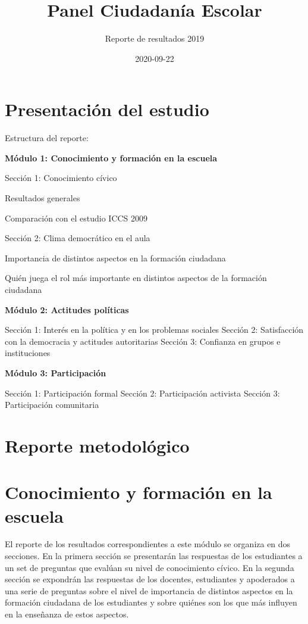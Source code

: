 \documentclass[
  14pt,
]{book}
\title{Panel Ciudadanía Escolar}
\subtitle{Reporte de resultados 2019}
\author{}
\date{\vspace{-2.5em}2020-09-22}
\begin{document}
\maketitle

{
\setcounter{tocdepth}{1}
\tableofcontents
}
\hypertarget{presentaciuxf3n-del-estudio}{%
\chapter*{Presentación del estudio}\label{presentaciuxf3n-del-estudio}}

Estructura del reporte:

\textbf{Módulo 1: Conocimiento y formación en la escuela}

Sección 1: Conocimiento cívico

Resultados generales

Comparación con el estudio ICCS 2009

Sección 2: Clima democrático en el aula

Importancia de distintos aspectos en la formación ciudadana

Quién juega el rol más importante en distintos aspectos de la formación ciudadana

\textbf{Módulo 2: Actitudes políticas}

Sección 1: Interés en la política y en los problemas sociales
Sección 2: Satisfacción con la democracia y actitudes autoritarias
Sección 3: Confianza en grupos e instituciones

\textbf{Módulo 3: Participación}

Sección 1: Participación formal
Sección 2: Participación activista
Sección 3: Participación comunitaria

\hypertarget{reporte-metodoluxf3gico}{%
\chapter*{Reporte metodológico}\label{reporte-metodoluxf3gico}}

\hypertarget{conocimiento-y-formaciuxf3n-en-la-escuela}{%
\chapter{Conocimiento y formación en la escuela}\label{conocimiento-y-formaciuxf3n-en-la-escuela}}

El reporte de los resultados correspondientes a este módulo se organiza en dos secciones. En la primera sección se presentarán las respuestas de los estudiantes a un set de preguntas que evalúan su nivel de conocimiento cívico. En la segunda sección se expondrán las respuestas de los docentes, estudiantes y apoderados a una serie de preguntas sobre el nivel de importancia de distintos aspectos en la formación ciudadana de los estudiantes y sobre quiénes son los que más influyen en la enseñanza de estos aspectos.
\end{document}
